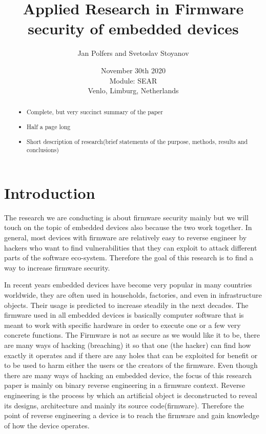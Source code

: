 \documentclass[]{report}
\title{Applied Research in Firmware security of embedded devices}
\author{Jan Polfers and Svetoslav Stoyanov}
\date{November 30th 2020 \\Module: SEAR \\Venlo, Limburg, Netherlands}
\begin{document}
\maketitle

\begin{abstract}

\begin{itemize}
	\item Complete, but very succinct summary of the paper
	\item Half a page long
	\item Short description of research(brief statements of the purpose, methods, results and conclusions)
\end{itemize}
\end{abstract}

\tableofcontents
\setcounter{page}{3}
\listoffigures %
\pagebreak

	
\section{Introduction}

The research we are conducting is about firmware security mainly but we will touch on the topic of embedded devices also because the two work together. In general, most devices with firmware are relatively easy to reverse engineer by hackers who want to find vulnerabilities that they can exploit to attack different parts of the software eco-system. Therefore the goal of this research is to find a way to increase firmware security.

In recent years embedded devices have become very popular in many countries worldwide, they are often used in households, factories, and even in infrastructure objects. Their usage is predicted to increase steadily in the next decades. The firmware used in all embedded devices is basically computer software that is meant to work with specific hardware in order to execute one or a few very concrete functions. The Firmware is not as secure as we would like it to be, there are many ways of hacking (breaching) it so that one (the hacker) can find how exactly it operates and if there are any holes that can be exploited for benefit or to be used to harm either the users or the creators of the firmware. Even though there are many ways of hacking an embedded device, the focus of this research paper is mainly on binary reverse engineering in a firmware context. Reverse engineering is the process by which an artificial object is deconstructed to reveal its designs, architecture and mainly its source code(firmware). Therefore the point of reverse engineering a device is to reach the firmware and gain knowledge of how the device operates.
\end{document}
